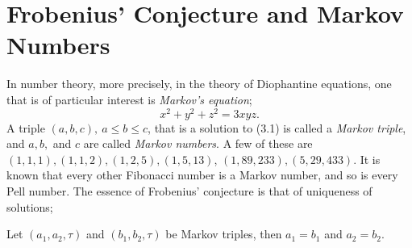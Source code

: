 \chapter{Frobenius' Conjecture and Markov Numbers}
In number theory, more precisely, in the theory of Diophantine equations, one that is of particular interest is \emph{Markov's equation};
\begin{equation}\label{Markov}
    x^2 + y^2 + z^2 = 3xyz.
\end{equation}
A triple $(a,b,c), \ a \leq b \leq c$, that is a solution to (3.1) is called a \emph{Markov triple}, and $a,b,$ and $c$ are called \emph{Markov numbers}. A few of these are $(1,1,1),(1,1,2), (1,2,5), (1,5,13)$, $(1, 89, 233), (5, 29, 433)$. It is known that every other Fibonacci number is a Markov number, and so is every Pell number. The essence of Frobenius' conjecture is that of uniqueness of solutions;
\begin{conjecture}
    Let $(a_1,a_2,\tau)$ and $(b_1,b_2,\tau)$ be Markov triples, then $a_1 = b_1$ and $a_2=b_2$. 
\end{conjecture}

